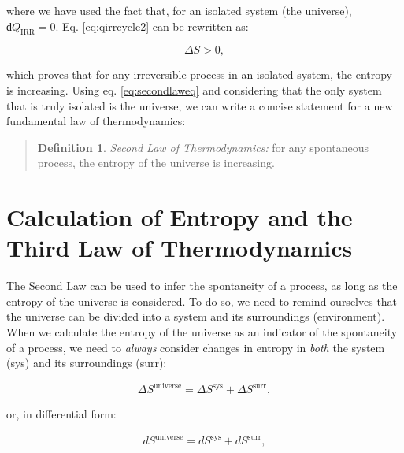 \documentclass[
  9pt,
]{extbook}
\theoremstyle{definition}
\newtheorem{definition}{Definition}[chapter]
\theoremstyle{definition}
\theoremstyle{definition}
\theoremstyle{remark}
\begin{document}
where we have used the fact that, for an isolated system (the universe), \(đQ_{\mathrm{IRR}}=0\). Eq. \eqref{eq:qirrcycle2} can be rewritten as:

\begin{equation}
\Delta S > 0,
\label{eq:secondlaweq}
\end{equation}

which proves that for any irreversible process in an isolated system, the entropy is increasing. Using eq. \eqref{eq:secondlaweq} and considering that the only system that is truly isolated is the universe, we can write a concise statement for a new fundamental law of thermodynamics:

\begin{quote}
\begin{definition}
\protect\hypertarget{def:secondlawdef}{}{\label{def:secondlawdef} }\emph{Second Law of Thermodynamics:} for any spontaneous process, the entropy of the universe is increasing.
\end{definition}
\end{quote}

\renewcommand*{\standardstate}{{-\kern-6pt{\ominus}\kern-6pt-}}

\hypertarget{thirdlaw}{%
\chapter{Calculation of Entropy and the Third Law of Thermodynamics}\label{thirdlaw}}

The Second Law can be used to infer the spontaneity of a process, as long as the entropy of the universe is considered. To do so, we need to remind ourselves that the universe can be divided into a system and its surroundings (environment). When we calculate the entropy of the universe as an indicator of the spontaneity of a process, we need to \emph{always} consider changes in entropy in \emph{both} the system (sys) and its surroundings (surr):

\begin{equation}
\Delta S^{\mathrm{universe}} = \Delta S^{\mathrm{sys}} + \Delta S^{\mathrm{surr}},
\label{eq:dsuniv}
\end{equation}

or, in differential form:

\begin{equation}
d S^{\mathrm{universe}} = d S^{\mathrm{sys}} + d S^{\mathrm{surr}},
\label{eq:dsunivd}
\end{equation}
\end{document}
